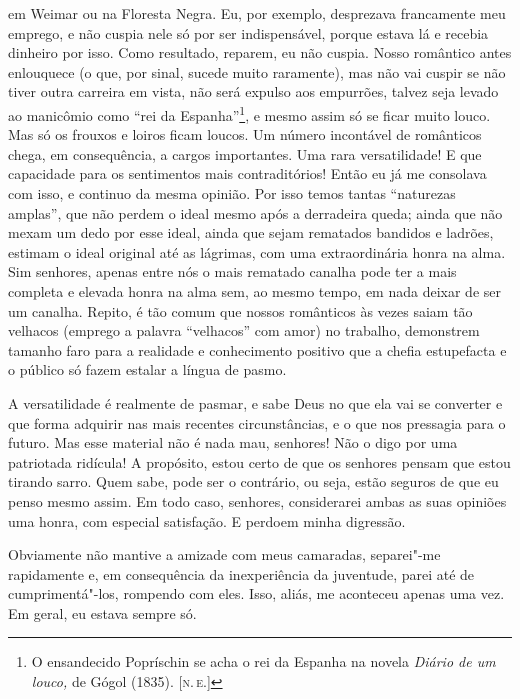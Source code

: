 em Weimar ou na Floresta Negra. Eu, por exemplo, desprezava francamente
meu emprego, e não cuspia nele só por ser indispensável, porque estava
lá e recebia dinheiro por isso. Como resultado, reparem, eu não cuspia.
Nosso romântico antes enlouquece (o que, por sinal, sucede muito
raramente), mas não vai cuspir se não tiver outra carreira em vista, não
será expulso aos empurrões, talvez seja levado ao manicômio como ``rei
da Espanha''\footnote{O ensandecido Popríschin se acha o rei da Espanha
  na novela \emph{Diário de um louco,} de Gógol (1835). {[}\textsc{n.\,e.}{]}}, e
mesmo assim só se ficar muito louco. Mas só os frouxos e loiros ficam
loucos. Um número incontável de românticos chega, em consequência, a
cargos importantes. Uma rara versatilidade! E que capacidade para os
sentimentos mais contraditórios! Então eu já me consolava com isso, e
continuo da mesma opinião. Por isso temos tantas ``naturezas amplas'',
que não perdem o ideal mesmo após a derradeira queda; ainda que não
mexam um dedo por esse ideal, ainda que sejam rematados bandidos e
ladrões, estimam o ideal original até as lágrimas, com uma
extraordinária honra na alma. Sim senhores, apenas entre nós o mais
rematado canalha pode ter a mais completa e elevada honra na alma sem,
ao mesmo tempo, em nada deixar de ser um canalha. Repito, é tão comum
que nossos românticos às vezes saiam tão velhacos (emprego a palavra
``velhacos'' com amor) no trabalho, demonstrem tamanho faro para a
realidade e conhecimento positivo que a chefia estupefacta e o público
só fazem estalar a língua de pasmo.

A versatilidade é realmente de pasmar, e sabe Deus no que ela vai se
converter e que forma adquirir nas mais recentes circunstâncias, e o que
nos pressagia para o futuro. Mas esse material não é nada mau, senhores!
Não o digo por uma patriotada ridícula! A propósito, estou certo de que
os senhores pensam que estou tirando sarro. Quem sabe, pode ser o
contrário, ou seja, estão seguros de que eu penso mesmo assim. Em todo
caso, senhores, considerarei ambas as suas opiniões uma honra, com
especial satisfação. E perdoem minha digressão.

Obviamente não mantive a amizade com meus camaradas, separei"-me
rapidamente e, em consequência da inexperiência da juventude, parei até
de cumprimentá"-los, rompendo com eles. Isso, aliás, me aconteceu apenas
uma vez. Em geral, eu estava sempre só.

